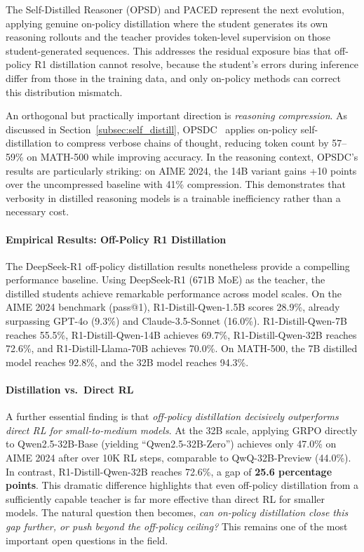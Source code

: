 \documentclass{article} %
\begin{document}
The Self-Distilled Reasoner (OPSD) \citep{2601.18734} and PACED \citep{2603.11178} represent the next evolution, applying genuine on-policy distillation where the student generates its own reasoning rollouts and the teacher provides token-level supervision on those student-generated sequences. This addresses the residual exposure bias that off-policy R1 distillation cannot resolve, because the student's errors during inference differ from those in the training data, and only on-policy methods can correct this distribution mismatch.

An orthogonal but practically important direction is \emph{reasoning compression}. As discussed in Section~\ref{subsec:self_distill}, OPSDC~\citep{2603.05433} applies on-policy self-distillation to compress verbose chains of thought, reducing token count by 57--59\% on MATH-500 while improving accuracy. In the reasoning context, OPSDC's results are particularly striking: on AIME 2024, the 14B variant gains +10 points over the uncompressed baseline with 41\% compression. This demonstrates that verbosity in distilled reasoning models is a trainable inefficiency rather than a necessary cost.

\paragraph{Empirical Results: Off-Policy R1 Distillation}
The DeepSeek-R1 off-policy distillation results nonetheless provide a compelling performance baseline. Using DeepSeek-R1 (671B MoE) as the teacher, the distilled students achieve remarkable performance across model scales. On the AIME 2024 benchmark (pass@1), R1-Distill-Qwen-1.5B scores 28.9\%, already surpassing GPT-4o (9.3\%) and Claude-3.5-Sonnet (16.0\%). R1-Distill-Qwen-7B reaches 55.5\%, R1-Distill-Qwen-14B achieves 69.7\%, R1-Distill-Qwen-32B reaches 72.6\%, and R1-Distill-Llama-70B achieves 70.0\%. On MATH-500, the 7B distilled model reaches 92.8\%, and the 32B model reaches 94.3\%.

\paragraph{Distillation vs.\ Direct RL}
A further essential finding is that \emph{off-policy distillation decisively outperforms direct RL for small-to-medium models}. At the 32B scale, applying GRPO directly to Qwen2.5-32B-Base (yielding ``Qwen2.5-32B-Zero'') achieves only 47.0\% on AIME 2024 after over 10K RL steps, comparable to QwQ-32B-Preview (44.0\%). In contrast, R1-Distill-Qwen-32B reaches 72.6\%, a gap of \textbf{25.6 percentage points}. This dramatic difference highlights that even off-policy distillation from a sufficiently capable teacher is far more effective than direct RL for smaller models. The natural question then becomes, \emph{can on-policy distillation close this gap further, or push beyond the off-policy ceiling?} This remains one of the most important open questions in the field.
\end{document}

